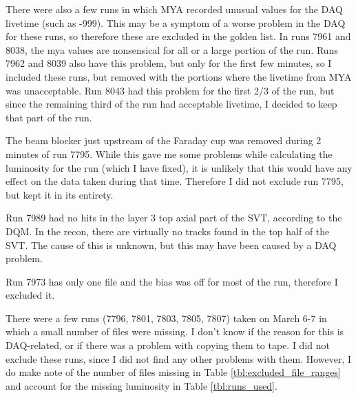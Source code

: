 \documentclass[11pt]{article}
\begin{document}

There were also a few runs in which MYA recorded unusual values for the DAQ livetime (such as -999).  This may be a symptom of a worse problem in the DAQ for these runs, so therefore these are excluded in the golden list.  In runs 7961 and 8038, the mya values are nonsensical for all or a large portion of the run.  Runs 7962 and 8039 also have this problem, but only for the first few minutes, so I included these runs, but removed with the portions where the livetime from MYA was unacceptable.  Run 8043 had this problem for the first 2/3 of the run, but since the remaining third of the run had acceptable livetime, I decided to keep that part of the run.  


The beam blocker just upstream of the Faraday cup was removed during 2 minutes of run 7795.  
While this gave me some problems while calculating the luminosity for the run (which I have fixed), it is unlikely that this would have any effect on the data taken during that time.    Therefore I did not exclude run 7795, but kept it in its entirety.  



Run 7989 had no hits in the layer 3 top axial part of the SVT, according to the DQM.  In the recon, there are virtually no tracks found in the top half of the SVT.  The cause of this is unknown, but this may have been caused by a DAQ problem.  

Run 7973 has only one file and the bias was off for most of the run, therefore I excluded it.  

There were a few runs (7796, 7801, 7803, 7805, 7807) taken on March 6-7 in which a small number of files were missing.  I don't know if the reason for this is DAQ-related, or if there was a problem with copying them to tape.  I did not exclude these runs, since I did not find any other problems with them.  However, I do make note of the number of files missing in Table \ref{tbl:excluded_file_ranges} and account for the missing luminosity in Table \ref{tbl:runs_used}.  
\end{document}
